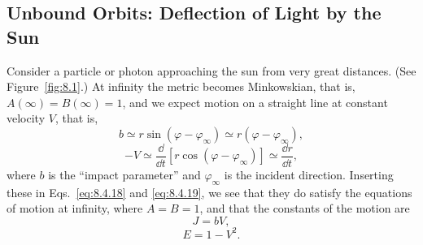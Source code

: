
\subsection{Unbound Orbits: Deflection of Light by the Sun}\label{sec:8.5}

Consider a particle or photon approaching the sun from very great distances.
(See Figure~\ref{fig:8.1}.) At infinity the metric becomes Minkowskian, that
is, \(A(\infty)=B(\infty)=1\), and we expect motion on a straight line at
constant velocity \(V\), that is,
\[
  b\simeq r\sin(\varphi-\varphi_\infty)
  \simeq r(\varphi-\varphi_\infty),
\]
\[
  -V
  \simeq
  \frac{\dd}{\dd t}\left[r\cos(\varphi-\varphi_\infty)\right]
  \simeq\frac{\dd r}{\dd t},
\]
where \(b\) is the ``impact parameter'' and \(\varphi_\infty\) is the
incident direction. Inserting these in Eqs.~\eqref{eq:8.4.18} and
\eqref{eq:8.4.19}, we see that they do satisfy the equations of motion at
infinity, where \(A=B=1\), and that the constants of the motion are
\begin{equation}
  J=bV,
  \tag{8.5.1}\label{eq:8.5.1}
\end{equation}
\begin{equation}
  E=1-V^2.
  \tag{8.5.2}\label{eq:8.5.2}
\end{equation}



